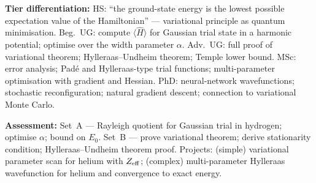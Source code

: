 \documentclass[11pt,a4paper]{article}
\begin{document}
\begin{tcolorbox}[modulebox, title={Module~II.1 --- Lecture L01: The Variational Principle}]
\medskip\textbf{Tier differentiation:}
HS: ``the ground-state energy is the lowest possible expectation value of the Hamiltonian'' ---
variational principle as quantum minimisation.
Beg.\ UG: compute $\langle\hat{H}\rangle$ for Gaussian trial state in a harmonic potential;
optimise over the width parameter $\alpha$.
Adv.\ UG: full proof of variational theorem; Hylleraas--Undheim theorem; Temple lower bound.
MSc: error analysis; Pad\'e and Hylleraas-type trial functions; multi-parameter optimisation
with gradient and Hessian.
PhD: neural-network wavefunctions; stochastic reconfiguration; natural gradient descent;
connection to variational Monte Carlo.

\medskip\textbf{Assessment:}
Set~A --- Rayleigh quotient for Gaussian trial in hydrogen; optimise $\alpha$; bound on $E_0$.
Set~B --- prove variational theorem; derive stationarity condition; Hylleraas--Undheim theorem proof.
Projects: (simple) variational parameter scan for helium with $Z_{\rm eff}$;
(complex) multi-parameter Hylleraas wavefunction for helium and convergence to exact energy.
\end{tcolorbox}

\medskip
\end{document}
